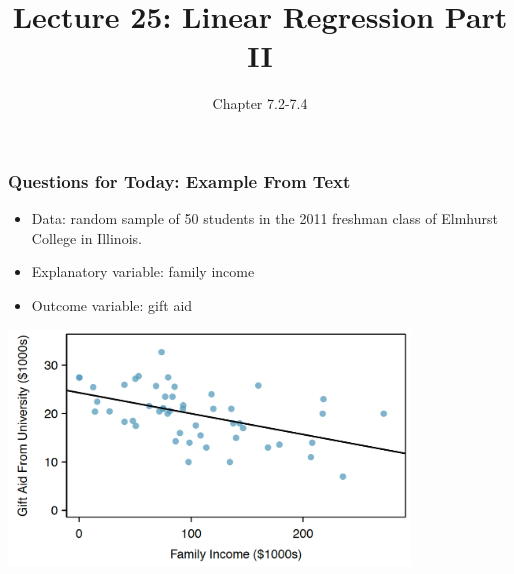 \documentclass[handout]{beamer}
\title{Lecture 25: Linear Regression Part II}
\author{Chapter 7.2-7.4}
\date{}
\newcommand{\blue}[1]{\textcolor{blue2}{#1}}
\begin{document}
\begin{frame}
\titlepage
\end{frame}


%
%
%
%
%
%
%
%



\begin{frame}[fragile]
\frametitle{Questions for Today: Example From Text}
\begin{itemize}
\item Data: random sample of 50 students in the 2011 freshman class of Elmhurst College in Illinois.
\pause\item Explanatory variable: family income
\pause\item Outcome variable: gift aid
\end{itemize}

\begin{center}
\includegraphics[width=0.8\textwidth]{figure/regression.png}
\end{center}

\end{frame}
\end{document}
